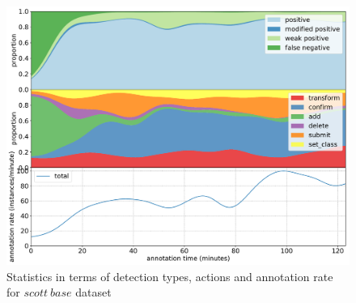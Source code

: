 \begin{figure}[!h]
\centering
\includegraphics[width=1.0\linewidth]{charts/action_annotations/scott_base.pdf}
\caption{ Statistics in terms of detection types, actions and annotation rate for $scott\:base$ dataset }
\label{fig:scott_base_annotation}
\end{figure}

